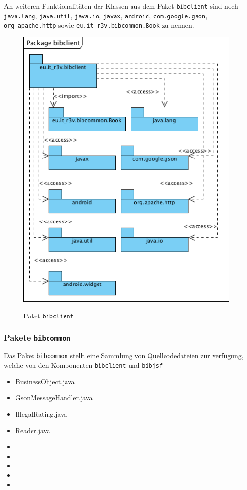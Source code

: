 \documentclass[fontsize=12pt,paper=a4,twoside]{scrartcl}
\begin{document}
\newpage

An weiteren Funktionalitäten der Klassen aus dem Paket \texttt{bibclient} sind noch \texttt{java.lang},
\texttt{java.util}, \texttt{java.io}, \texttt{javax}, \texttt{android}, \texttt{com.google.gson}, \texttt{org.apache.http} sowie \texttt{eu.it\_r3v.bibcommon.Book} zu nennen.

\begin{figure} [H] 
\caption{Paket \texttt{bibclient}} \centering
	\includegraphics[scale=2]{Diagramme/Packagebibclient.png} 
	\label{pic:PackageClient} 
\end{figure}


\subsubsection{Pakete \texttt{bibcommon}}
\label{sec:bibcommon}

Das Paket \texttt{bibcommon} stellt eine Sammlung von Quellcodedateien zur verfügung, welche von den Komponenten \texttt{bibclient} und \texttt{bibjsf}

\begin{itemize}
\item{BusinessObject.java}
\item{GsonMessageHandler.java}
\item{IllegalRating.java}
\item{Reader.java}
\item{}
\item{}
\item{}
\item{}
\item{}
\end{itemize}
\end{document}
